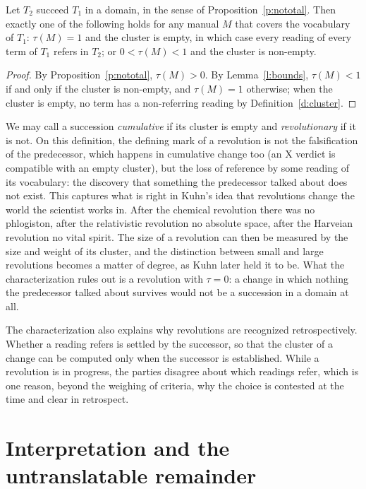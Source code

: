 \documentclass{situationist-preprint}
\begin{document}
\begin{proposition}\label{p:cumulative}
Let $T_2$ succeed $T_1$ in a domain, in the sense of Proposition~\ref{p:nototal}. Then exactly one of the following holds for any manual $M$ that covers the vocabulary of $T_1$: $\tau(M) = 1$ and the cluster is empty, in which case every reading of every term of $T_1$ refers in $T_2$; or $0<\tau(M)<1$ and the cluster is non-empty.
\end{proposition}

\begin{proof}
By Proposition~\ref{p:nototal}, $\tau(M) > 0$. By Lemma~\ref{l:bounds}, $\tau(M)<1$ if and only if the cluster is non-empty, and $\tau(M)=1$ otherwise; when the cluster is empty, no term has a non-referring reading by Definition~\ref{d:cluster}.
\end{proof}

We may call a succession \emph{cumulative} if its cluster is empty and \emph{revolutionary} if it is not. On this definition, the defining mark of a revolution is not the falsification of the predecessor, which happens in cumulative change too (an X verdict is compatible with an empty cluster), but the loss of reference by some reading of its vocabulary: the discovery that something the predecessor talked about does not exist. This captures what is right in Kuhn's idea that revolutions change the world the scientist works in. After the chemical revolution there was no phlogiston, after the relativistic revolution no absolute space, after the Harveian revolution no vital spirit. The size of a revolution can then be measured by the size and weight of its cluster, and the distinction between small and large revolutions becomes a matter of degree, as Kuhn later held it to be. What the characterization rules out is a revolution with $\tau = 0$: a change in which nothing the predecessor talked about survives would not be a succession in a domain at all.

The characterization also explains why revolutions are recognized retrospectively. Whether a reading refers is settled by the successor, so that the cluster of a change can be computed only when the successor is established. While a revolution is in progress, the parties disagree about which readings refer, which is one reason, beyond the weighing of criteria, why the choice is contested at the time and clear in retrospect.

\section{Interpretation and the untranslatable remainder}\label{s:interp}
\end{document}
